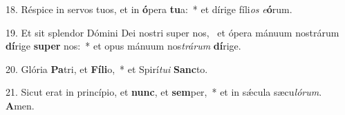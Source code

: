 18. Réspice in servos tuos, et in \textbf{ó}pera \textbf{tu}a:~*  et dírige fíli\textit{os} \textit{e}\textbf{ó}rum.\

19. Et sit splendor Dómini Dei nostri super nos, \dag\  et ópera mánuum nostrárum \textbf{dí}rige \textbf{su}\textbf{per} nos:~*  et opus mánuum nos\textit{trá}\textit{rum} \textbf{dí}rige.\

20. Glória \textbf{Pa}tri, et \textbf{Fí}\textbf{li}o,~*  et Spirí\textit{tu}\textit{i} \textbf{Sanc}to.\

21. Sicut erat in princípio, et \textbf{nunc}, et \textbf{sem}per,~*  et in sǽcula sæcu\textit{ló}\textit{rum}. \textbf{A}men.\

